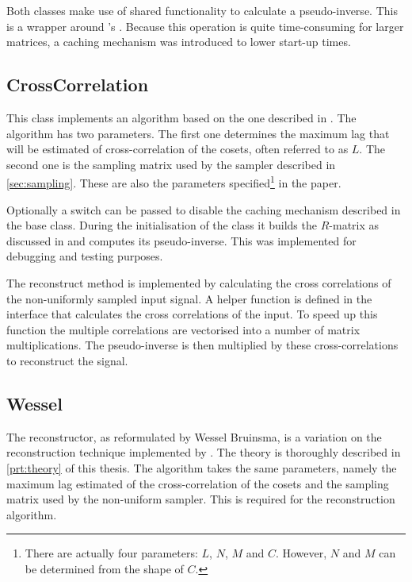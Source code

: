 \documentclass[a4paper, openany, oneside]{memoir}
\begin{document}
Both classes make use of shared functionality to calculate a pseudo-inverse. This is a wrapper around 's . Because this operation is quite time-consuming for larger matrices, a caching mechanism was introduced to lower start-up times.

\subsection{CrossCorrelation}
\label{sub:crosscorrelation}
This class implements an algorithm based on the one described in \cite{ariananda2012compressive}. The algorithm has two parameters. The first one determines the maximum lag that will be estimated of cross-correlation of the cosets, often referred to as $L$. The second one is the sampling matrix used by the sampler described in \cref{sec:sampling}. These are also the parameters specified\footnote{\label{fn:reconparam}There are actually four parameters: $L$, $N$, $M$ and $C$. However, $N$ and $M$ can be determined from the shape of $C$.} in the paper.

Optionally a switch can be passed to disable the caching mechanism described in the base class. During the initialisation of the class it builds the $R$-matrix as discussed in \cite{ariananda2012compressive} and computes its pseudo-inverse. This was implemented for debugging and testing purposes.

The reconstruct method is implemented by calculating the cross correlations of the non-uniformly sampled input signal. A helper function is defined in the \\ interface that calculates the cross correlations of the input. To speed up this function the multiple correlations are vectorised into a number of matrix multiplications. The pseudo-inverse is then multiplied by these cross-correlations to reconstruct the signal.

\subsection{Wessel}
\label{sub:wessel}
The reconstructor, as reformulated by Wessel Bruinsma, is a variation on the reconstruction technique implemented by . The theory is thoroughly described in \cref{prt:theory} of this thesis. The algorithm takes the same parameters, namely the maximum lag estimated of the cross-correlation of the cosets and the sampling matrix used by the non-uniform sampler. This is required for the reconstruction algorithm.
\end{document}
